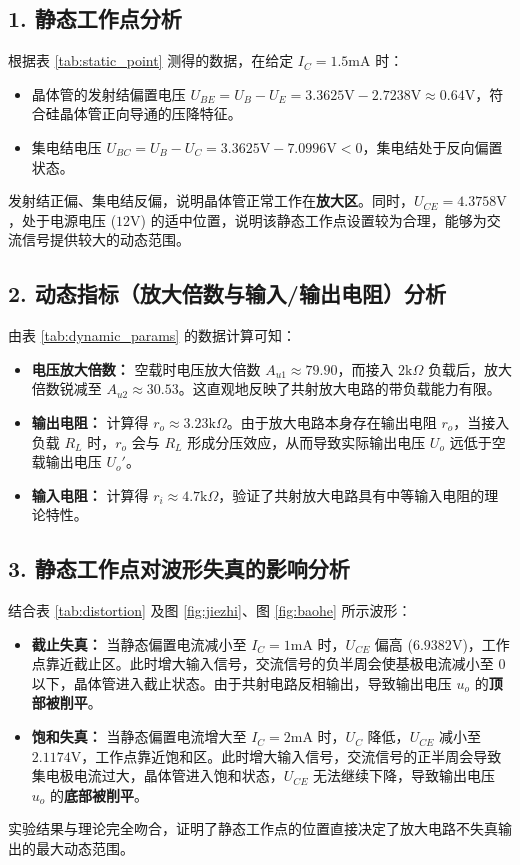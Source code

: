 \documentclass[10.5pt]{config}
\begin{document}
\subsection*{1. 静态工作点分析}
根据表 \ref{tab:static_point} 测得的数据，在给定 $I_C = 1.5\mathrm{mA}$ 时：
\begin{itemize}[leftmargin=2em]
    \item 晶体管的发射结偏置电压 $U_{BE} = U_B - U_E = 3.3625\mathrm{V} - 2.7238\mathrm{V} \approx 0.64\mathrm{V}$，符合硅晶体管正向导通的压降特征。
    \item 集电结电压 $U_{BC} = U_B - U_C = 3.3625\mathrm{V} - 7.0996\mathrm{V} < 0$，集电结处于反向偏置状态。
\end{itemize}
发射结正偏、集电结反偏，说明晶体管正常工作在\textbf{放大区}。同时，$U_{CE} = 4.3758\mathrm{V}$，处于电源电压 ($12\mathrm{V}$) 的适中位置，说明该静态工作点设置较为合理，能够为交流信号提供较大的动态范围。

\subsection*{2. 动态指标（放大倍数与输入/输出电阻）分析}
由表 \ref{tab:dynamic_params} 的数据计算可知：
\begin{itemize}[leftmargin=2em]
    \item \textbf{电压放大倍数：} 空载时电压放大倍数 $A_{u1} \approx 79.90$，而接入 $2\mathrm{k}\Omega$ 负载后，放大倍数锐减至 $A_{u2} \approx 30.53$。这直观地反映了共射放大电路的带负载能力有限。
    \item \textbf{输出电阻：} 计算得 $r_o \approx 3.23\mathrm{k}\Omega$。由于放大电路本身存在输出电阻 $r_o$，当接入负载 $R_L$ 时，$r_o$ 会与 $R_L$ 形成分压效应，从而导致实际输出电压 $U_o$ 远低于空载输出电压 $U_o'$。
    \item \textbf{输入电阻：} 计算得 $r_i \approx 4.7\mathrm{k}\Omega$，验证了共射放大电路具有中等输入电阻的理论特性。
\end{itemize}

\subsection*{3. 静态工作点对波形失真的影响分析}
结合表 \ref{tab:distortion} 及图 \ref{fig:jiezhi}、图 \ref{fig:baohe} 所示波形：
\begin{itemize}[leftmargin=2em]
    \item \textbf{截止失真：} 当静态偏置电流减小至 $I_C = 1\mathrm{mA}$ 时，$U_{CE}$ 偏高 ($6.9382\mathrm{V}$)，工作点靠近截止区。此时增大输入信号，交流信号的负半周会使基极电流减小至 0 以下，晶体管进入截止状态。由于共射电路反相输出，导致输出电压 $u_o$ 的\textbf{顶部被削平}。
    \item \textbf{饱和失真：} 当静态偏置电流增大至 $I_C = 2\mathrm{mA}$ 时，$U_C$ 降低，$U_{CE}$ 减小至 $2.1174\mathrm{V}$，工作点靠近饱和区。此时增大输入信号，交流信号的正半周会导致集电极电流过大，晶体管进入饱和状态，$U_{CE}$ 无法继续下降，导致输出电压 $u_o$ 的\textbf{底部被削平}。
\end{itemize}
实验结果与理论完全吻合，证明了静态工作点的位置直接决定了放大电路不失真输出的最大动态范围。
\end{document}
